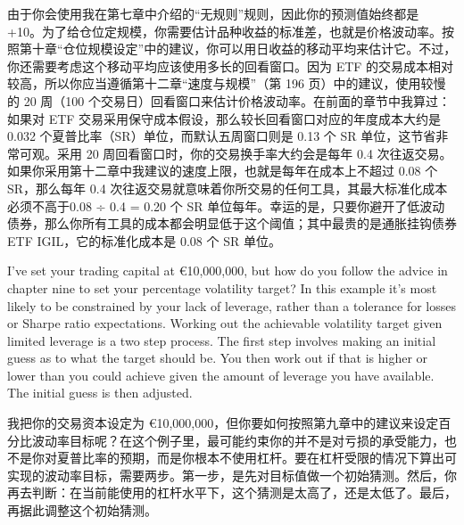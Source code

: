 \begin{chineseblock}由于你会使用我在第七章中介绍的“无规则”规则，因此你的预测值始终都是 +10。为了给仓位定规模，你需要估计品种收益的标准差，也就是价格波动率。按照第十章“仓位规模设定”中的建议，你可以用日收益的移动平均来估计它。不过，你还需要考虑这个移动平均应该使用多长的回看窗口。因为 ETF 的交易成本相对较高，所以你应当遵循第十二章“速度与规模”（第 196 页）中的建议，使用较慢的 20 周（100 个交易日）回看窗口来估计价格波动率。在前面的章节中我算过：如果对 ETF 交易采用保守成本假设，那么较长回看窗口对应的年度成本大约是 0.032 个夏普比率（SR）单位，而默认五周窗口则是 0.13 个 SR 单位，这节省非常可观。采用 20 周回看窗口时，你的交易换手率大约会是每年 0.4 次往返交易。如果你采用第十二章中我建议的速度上限，也就是每年在成本上不超过 0.08 个 SR，那么每年 0.4 次往返交易就意味着你所交易的任何工具，其最大标准化成本必须不高于0.08 ÷ 0.4 = 0.20 个 SR 单位每年。幸运的是，只要你避开了低波动债券，那么你所有工具的成本都会明显低于这个阈值；其中最贵的是通胀挂钩债券 ETF IGIL，它的标准化成本是 0.08 个 SR 单位。\end{chineseblock}


\begin{englishblock} I've set your trading capital at €10,000,000, but how do you follow the advice in chapter nine to set your percentage volatility target? In this example it's most likely to be constrained by your lack of leverage, rather than a tolerance for losses or Sharpe ratio expectations. Working out the achievable volatility target given limited leverage is a two step process. The first step involves making an initial guess as to what the target should be. You then work out if that is higher or lower than you could achieve given the amount of leverage you have available. The initial guess is then adjusted. \end{englishblock}

\begin{chineseblock}我把你的交易资本设定为 €10,000,000，但你要如何按照第九章中的建议来设定百分比波动率目标呢？在这个例子里，最可能约束你的并不是对亏损的承受能力，也不是你对夏普比率的预期，而是你根本不使用杠杆。要在杠杆受限的情况下算出可实现的波动率目标，需要两步。第一步，是先对目标值做一个初始猜测。然后，你再去判断：在当前能使用的杠杆水平下，这个猜测是太高了，还是太低了。最后，再据此调整这个初始猜测。\end{chineseblock}

\bipairgap

